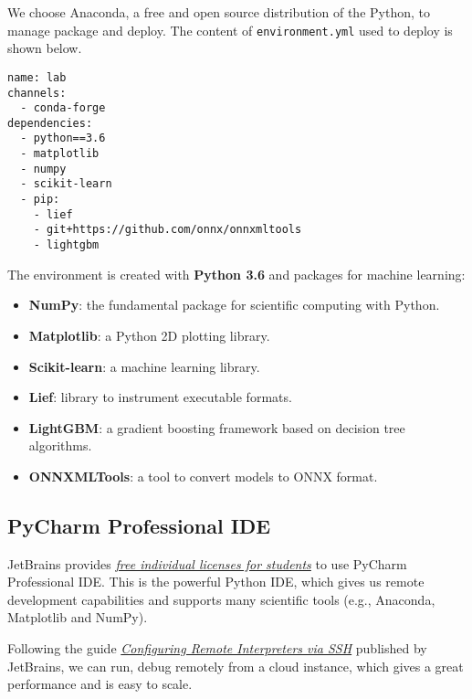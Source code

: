 We choose Anaconda, a free and open source distribution of the Python, to manage package and deploy. The content of \verb|environment.yml| used to deploy is shown below. 

\begin{lstlisting}
name: lab
channels:
  - conda-forge
dependencies:
  - python==3.6
  - matplotlib
  - numpy
  - scikit-learn
  - pip:
    - lief
    - git+https://github.com/onnx/onnxmltools
    - lightgbm
\end{lstlisting}

The environment is created with \textbf{Python 3.6} and packages for machine learning:

\begin{itemize}
\item \textbf{NumPy}: the fundamental package for scientific computing with Python.
\item \textbf{Matplotlib}: a Python 2D plotting library.
\item \textbf{Scikit-learn}: a machine learning library.
\item \textbf{Lief}: library to instrument executable formats.
\item \textbf{LightGBM}: a gradient boosting framework based on decision tree algorithms.
\item \textbf{ONNXMLTools}: a tool to convert models to ONNX format.
\end{itemize}

\subsection{PyCharm Professional IDE}

JetBrains provides \textit{\href{https://www.jetbrains.com/student/}{free individual licenses for students}} to use PyCharm Professional IDE. This is the powerful Python IDE, which gives us remote development capabilities and supports many scientific tools (e.g., Anaconda, Matplotlib and NumPy).

Following the guide \textit{\href{https://www.jetbrains.com/help/pycharm/configuring-remote-interpreters-via-ssh.html}{Configuring Remote Interpreters via SSH}} published by JetBrains, we can run, debug remotely from a cloud instance, which gives a great performance and is easy to scale.
